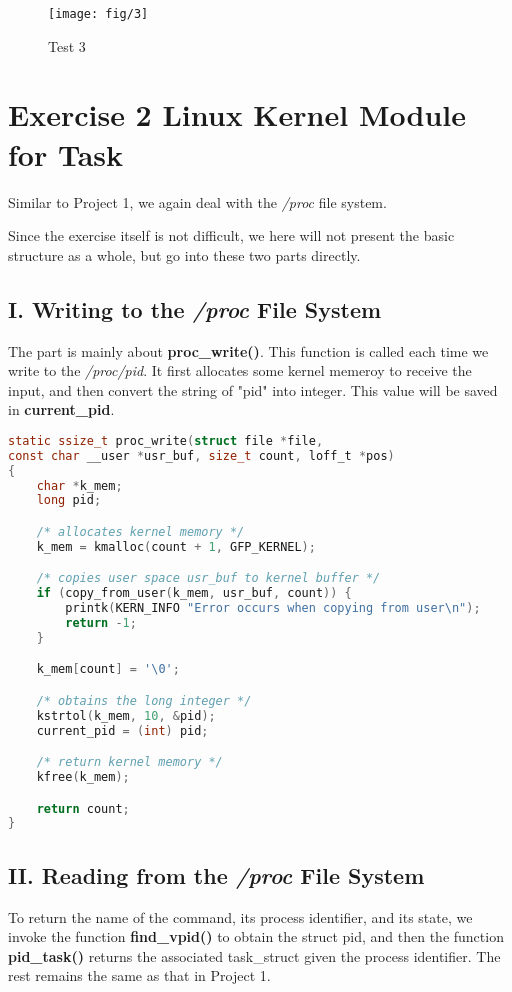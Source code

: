 \documentclass{article}
\begin{document}
\begin{figure}[h]
    \centering
    
    \texttt{[image: fig/3]}
    \caption{Test 3}
    \label{3}
\end{figure}


\section*{Exercise 2 Linux Kernel Module for Task}
Similar to Project 1, we again deal with the \textit{/proc} file system. 

Since the exercise itself is not difficult, we here will not present the basic structure as a whole, but go into these two parts directly.

\subsection*{I. Writing to the \textit{/proc} File System}
The part is mainly about \textbf{proc\_write()}. This function is called each time we write to the \textit{/proc/pid}. It first allocates some kernel memeroy to receive the input, and then convert the string of "pid" into integer. This value will be saved in \textbf{current\_pid}. 

\begin{lstlisting}[language=c, caption={proc\_read()}, captionpos=b]
static ssize_t proc_write(struct file *file,
const char __user *usr_buf, size_t count, loff_t *pos)
{
    char *k_mem;
    long pid;

    /* allocates kernel memory */
    k_mem = kmalloc(count + 1, GFP_KERNEL);

    /* copies user space usr_buf to kernel buffer */
    if (copy_from_user(k_mem, usr_buf, count)) {
        printk(KERN_INFO "Error occurs when copying from user\n");
        return -1;
    }

    k_mem[count] = '\0';

    /* obtains the long integer */
    kstrtol(k_mem, 10, &pid);
    current_pid = (int) pid;

    /* return kernel memory */
    kfree(k_mem);

    return count;
}
\end{lstlisting}

\subsection*{II. Reading from the \textit{/proc} File System}
To return the name of the command, its process identifier, and its state, we invoke the function \textbf{find\_vpid()} to obtain the struct pid, and then the function \textbf{pid\_task()} returns the associated
task\_struct given the process identifier. The rest remains the same as that in Project 1.
\end{document}
